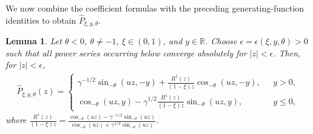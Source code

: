 \documentclass[10pt,a4paper]{amsart}
\newcommand{\R}{\mathbb{R}} %
\newcommand{\1}{\mathds{1}}
\newtheorem{Lemma}[definition]{Lemma}
\begin{document}
We now combine the coefficient formulas with the preceding generating-function identities to obtain $\hat{P}_{\xi,y,\theta}$.
\begin{Lemma}\label{gf_neg_theta}
Let $\theta<0$, $\theta\neq-1$, $\xi\in(0,1)$, and $y\in\R$.
Choose $\epsilon=\epsilon(\xi,y,\theta)>0$ such that all power series
occurring below converge absolutely for $|z|<\epsilon$. Then, for
$|z|<\epsilon$,
    \begin{align*}
      \hat{P}_{\xi,y,\theta}(z)=  
      \begin{cases}
          \gamma^{-1/2}\sin_{-\theta}(uz,-y)+\frac{R^1(z)}{(1-\xi) z}\cos_{-\theta}(uz,-y),~~~&y>0,
          \\\cos_{-\theta}(uz,y)
     -\gamma^{1/2}\frac{R^1(z)}{(1-\xi) z}\sin_{-\theta}(uz,y),&y\le 0,
      \end{cases}
    \end{align*}
    where $\frac{R^1(z)}{(1-\xi) z}=\frac{\cos_{-\theta}(uz)-\gamma^{-1/2}\sin_{-\theta}(uz)}{\cos_{-\theta}(uz)+\gamma^{1/2}\sin_{-\theta}(uz)}$.
\end{Lemma}
\end{document}
